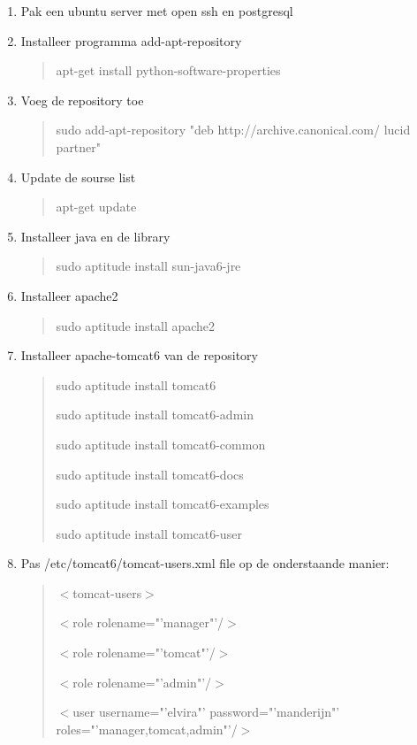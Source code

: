 \begin{enumerate}
	\item Pak een ubuntu server met open ssh en postgresql
	\item Installeer programma add-apt-repository			
			\begin{quote}
				apt-get install python-software-properties 
			\end{quote}
	\item Voeg de repository toe
			\begin{quote}
				sudo add-apt-repository "deb http://archive.canonical.com/ lucid partner"
			\end{quote}
	\item Update de sourse list
			\begin{quote}
				apt-get update
			\end{quote}
	\item Installeer java en de library
			\begin{quote}
				sudo aptitude install sun-java6-jre 
			\end{quote}
	\item Installeer apache2
			\begin{quote}
				sudo aptitude install apache2
			\end{quote} 
	\item Installeer apache-tomcat6 van de repository
			\begin{quote}
				sudo aptitude install tomcat6
				
				sudo aptitude install tomcat6-admin
				
				sudo aptitude install tomcat6-common
				
				sudo aptitude install tomcat6-docs
				
				sudo aptitude install tomcat6-examples 
				
				sudo aptitude install tomcat6-user
			\end{quote} 
	\item Pas /etc/tomcat6/tomcat-users.xml file op de onderstaande manier: 
			\begin{quote}
				$<$tomcat-users$>$
				
				\quad $<$role rolename="'manager"'/$>$
				
				\quad $<$role rolename="'tomcat"'/$>$
				
				\quad $<$role rolename="'admin"'/$>$
				
				\quad $<$user username="'elvira"' password="'manderijn"' roles="'manager,tomcat,admin"'/$>$
				

\end{quote}
\end{enumerate}
